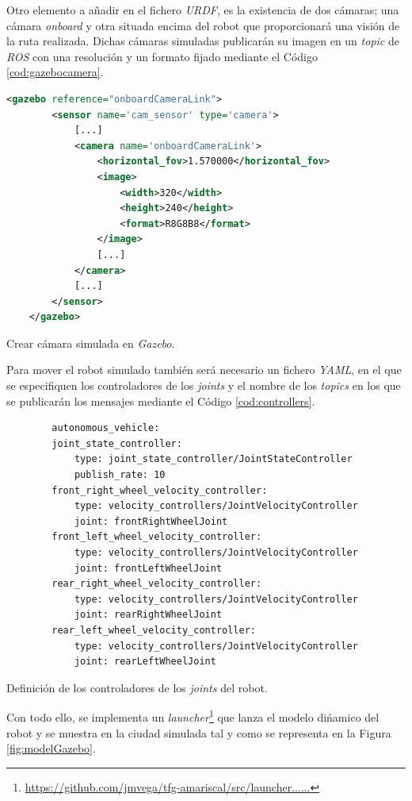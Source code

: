 Otro elemento a añadir en el fichero \textit{URDF}, es la existencia de dos cámaras; una cámara \textit{onboard} y otra situada encima del robot que proporcionará una visión de la
ruta realizada. Dichas cámaras simuladas publicarán su imagen en un \textit{topic} de \textit{ROS} con una resolución y un formato fijado mediante el Código \ref{cod:gazebocamera}.\\

\begin{code}[h]
	\begin{lstlisting}[language=XML]
	<gazebo reference="onboardCameraLink">
		<sensor name='cam_sensor' type='camera'>
			[...]
			<camera name='onboardCameraLink'>
				<horizontal_fov>1.570000</horizontal_fov>
				<image>
					<width>320</width>
					<height>240</height>
					<format>R8G8B8</format>
				</image>
				[...]
			</camera>
			[...]
		</sensor>
	</gazebo>
	\end{lstlisting}
	\caption[Crear cámara simulada en \textit{Gazebo}.]{Crear cámara simulada en \textit{Gazebo}.}
	\label{cod:gazebocamera}
\end{code}

Para mover el robot simulado también será necesario un fichero \textit{YAML}, en el que se especifiquen los controladores de los \textit{joints} y el nombre de los \textit{topics} en los que se publicarán los mensajes mediante el Código \ref{cod:controllers}.\\

\begin{code}[h]
	\begin{lstlisting}
		autonomous_vehicle:
		joint_state_controller:
			type: joint_state_controller/JointStateController
			publish_rate: 10
		front_right_wheel_velocity_controller:
			type: velocity_controllers/JointVelocityController
			joint: frontRightWheelJoint
		front_left_wheel_velocity_controller:
			type: velocity_controllers/JointVelocityController
			joint: frontLeftWheelJoint
		rear_right_wheel_velocity_controller:
			type: velocity_controllers/JointVelocityController
			joint: rearRightWheelJoint
		rear_left_wheel_velocity_controller:
			type: velocity_controllers/JointVelocityController
			joint: rearLeftWheelJoint
	\end{lstlisting}
	\caption[Definición de los controladores de los \textit{joints} del robot.]{Definición de los controladores de los \textit{joints} del robot.}
	\label{cod:controllers}
\end{code}

Con todo ello, se implementa un \textit{launcher}\footnote{\url{https://github.com/jmvega/tfg-amariscal/src/launcher......}} que lanza el modelo dińamico del robot y se muestra en la ciudad simulada tal y como se representa en la Figura \ref{fig:modelGazebo}.\\

